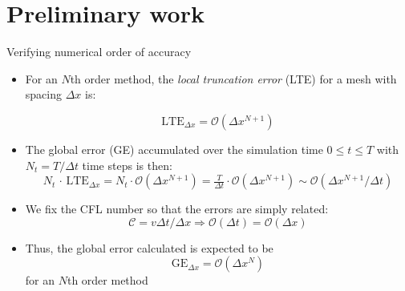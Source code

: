 \documentclass{beamer}
\begin{document}
\section{Preliminary work}  


\begin{frame}


\end{frame}


\begin{frame}{Verifying numerical order of accuracy}
\begin{itemize}
\item For an $N$th order method, the \emph{local truncation error} (LTE) for a mesh with spacing $\Delta x$ is:

$$\mathrm{LTE}_{\Delta x} = \mathcal{O}(\Delta x^{N+1})$$

\item The global error (GE) accumulated over the simulation time $0 \leq t \leq T$ with $N_t = T / \Delta t	$ time steps is then:
$$N_t \,\cdot \, \mathrm{LTE}_{\Delta x} = N_t \cdot \mathcal{O}(\Delta x^{N+1}) = \tfrac{T}{\Delta t}\cdot \mathcal{O}(\Delta x^{N+1}) \sim \mathcal{O}(\Delta x^{N+1} / \Delta t)$$
\item We fix the CFL number so that the errors are simply related: 
$$\mathcal{C} = v\Delta t / \Delta x \Rightarrow \mathcal{O}(\Delta t) = \mathcal{O}(\Delta x)$$
\item Thus, the global error calculated is expected to be 
$$\mathrm{GE}_{\Delta x} = \mathcal{O}(\Delta x^N)$$
for an $N$th order method
\end{itemize}
\end{frame}

\end{document}
